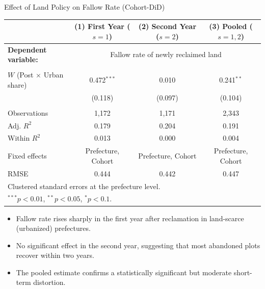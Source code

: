 \documentclass[10pt, xcolor=x11names,compress, aspectratio=169]{beamer}
\begin{document}
\begin{frame}{Effect of Land Policy on Fallow Rate (Cohort-DiD)}
\begin{table}[h!]
\centering
\footnotesize
\begin{tabular}{lccc}
\hline\hline
 & (1) First Year ($s=1$) & (2) Second Year ($s=2$) & (3) Pooled ($s=1,2$) \\
\hline
\textbf{Dependent variable:} & \multicolumn{3}{c}{Fallow rate of newly reclaimed land} \\
\\[-0.7em]
$W$ (Post $\times$ Urban share) & 0.472$^{***}$ & 0.010 & 0.241$^{**}$ \\
 & (0.118) & (0.097) & (0.104) \\
\\[-0.7em]
Observations & 1,172 & 1,171 & 2,343 \\
Adj. $R^2$ & 0.179 & 0.204 & 0.191 \\
Within $R^2$ & 0.013 & 0.000 & 0.004 \\
Fixed effects & Prefecture, Cohort & Prefecture, Cohort & Prefecture, Cohort \\
RMSE & 0.444 & 0.442 & 0.447 \\
\hline
\multicolumn{4}{l}{\footnotesize Clustered standard errors at the prefecture level.} \\
\multicolumn{4}{l}{\footnotesize $^{***}p<0.01$, $^{**}p<0.05$, $^{*}p<0.1$.} \\
\hline\hline
\end{tabular}
\end{table}

\begin{itemize}
    \item Fallow rate rises sharply in the first year after reclamation in land-scarce (urbanized) prefectures.  
    \item No significant effect in the second year, suggesting that most abandoned plots recover within two years.  
    \item The pooled estimate confirms a statistically significant but moderate short-term distortion.
\end{itemize}

\end{frame}
\end{document}
